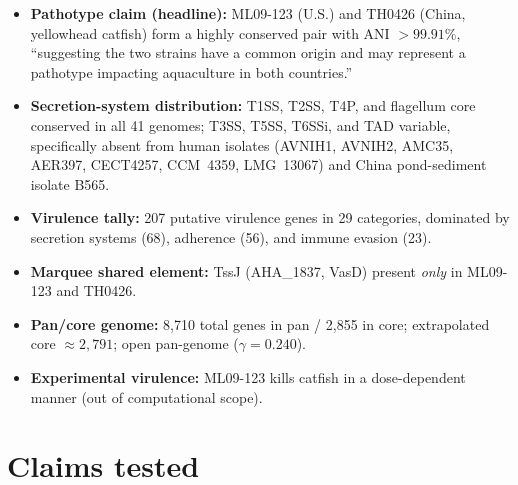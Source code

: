 \documentclass[11pt]{article}
\begin{document}
\begin{itemize}
  \item \textbf{Pathotype claim (headline):} ML09-123 (U.S.) and TH0426 (China,
        yellowhead catfish) form a highly conserved pair with ANI $> 99.91\%$,
        ``suggesting the two strains have a common origin and may represent a
        pathotype impacting aquaculture in both countries.''
  \item \textbf{Secretion-system distribution:} T1SS, T2SS, T4P, and flagellum
        core conserved in all 41 genomes; T3SS, T5SS, T6SSi, and TAD variable,
        specifically absent from human isolates (AVNIH1, AVNIH2, AMC35, AER397,
        CECT4257, CCM~4359, LMG~13067) and China pond-sediment isolate B565.
  \item \textbf{Virulence tally:} 207 putative virulence genes in 29
        categories, dominated by secretion systems (68), adherence (56), and
        immune evasion (23).
  \item \textbf{Marquee shared element:} TssJ (AHA\_1837, VasD) present
        \emph{only} in ML09-123 and TH0426.
  \item \textbf{Pan/core genome:} 8{,}710 total genes in pan / 2{,}855 in core;
        extrapolated core $\approx 2{,}791$; open pan-genome ($\gamma = 0.240$).
  \item \textbf{Experimental virulence:} ML09-123 kills catfish in a
        dose-dependent manner (out of computational scope).
\end{itemize}

\section{Claims tested}
\end{document}
